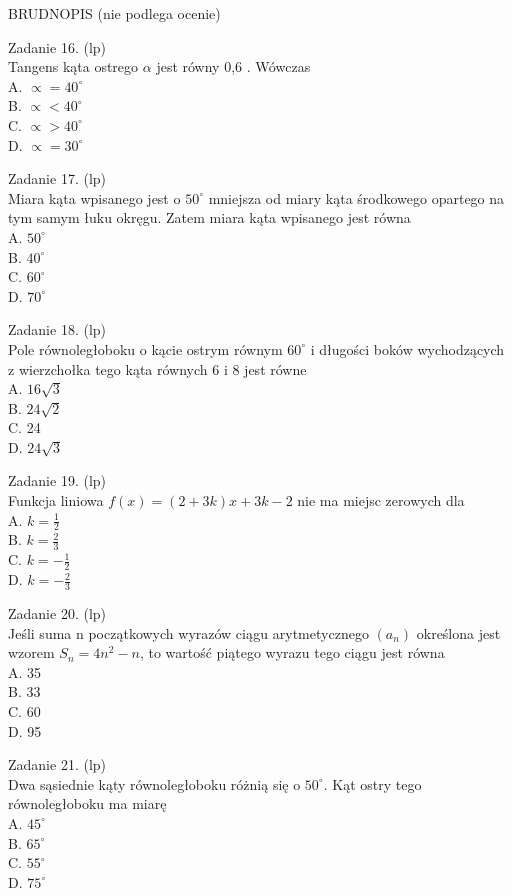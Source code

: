 \documentclass[10pt]{article}
\begin{document}
BRUDNOPIS (nie podlega ocenie)

Zadanie 16. (lp)\\
Tangens kąta ostrego \(\alpha\) jest równy 0,6 . Wówczas\\
A. \(\propto=40^{\circ}\)\\
B. \(\propto<40^{\circ}\)\\
C. \(\propto>40^{\circ}\)\\
D. \(\propto=30^{\circ}\)

Zadanie 17. (lp)\\
Miara kąta wpisanego jest o \(50^{\circ}\) mniejsza od miary kąta środkowego opartego na tym samym łuku okręgu. Zatem miara kąta wpisanego jest równa\\
A. \(50^{\circ}\)\\
B. \(40^{\circ}\)\\
C. \(60^{\circ}\)\\
D. \(70^{\circ}\)

Zadanie 18. (lp)\\
Pole równoległoboku o kącie ostrym równym \(60^{\circ}\) i długości boków wychodzących z wierzchołka tego kąta równych 6 i 8 jest równe\\
A. \(16 \sqrt{3}\)\\
B. \(24 \sqrt{2}\)\\
C. 24\\
D. \(24 \sqrt{3}\)

Zadanie 19. (lp)\\
Funkcja liniowa \(f(x)=(2+3 k) x+3 k-2\) nie ma miejsc zerowych dla\\
A. \(k=\frac{1}{2}\)\\
B. \(k=\frac{2}{3}\)\\
C. \(k=-\frac{1}{2}\)\\
D. \(k=-\frac{2}{3}\)

Zadanie 20. (lp)\\
Jeśli suma n początkowych wyrazów ciągu arytmetycznego \(\left(a_{n}\right)\) określona jest wzorem \(S_{n}=4 n^{2}-n\), to wartość piątego wyrazu tego ciągu jest równa\\
A. 35\\
B. 33\\
C. 60\\
D. 95

Zadanie 21. (lp)\\
Dwa sąsiednie kąty równoległoboku różnią się o \(50^{\circ}\). Kąt ostry tego równoległoboku ma miarę\\
A. \(45^{\circ}\)\\
B. \(65^{\circ}\)\\
C. \(55^{\circ}\)\\
D. \(75^{\circ}\)
\end{document}
